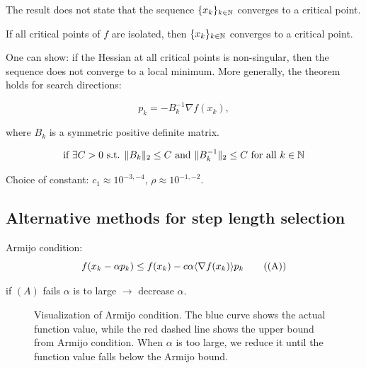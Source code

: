 \begin{remark}{}{}

    The result does not state that the sequence  \(\{x_k\}_{k \in \mathbb{N}}\) converges to a critical point.

    If all critical points of  \(f\) are isolated, then  \(\{x_k\}_{k \in \mathbb{N}}\) converges to a critical point.
\end{remark}

One can show: if the Hessian at all critical points is non-singular, then the sequence does not converge to a local minimum.
More generally, the theorem holds for search directions:

\[
    p_k = - B_k^{-1} \nabla f(x_k),
\]

where  \(B_k\) is a symmetric positive definite matrix.

\[
    \text{if } \exists C > 0 \text{ s.t. } \lVert B_k\rVert_2 \leq C \text{ and } \lVert B_k^{-1}\rVert_2 \leq C \text{ for all } k \in \mathbb{N}
\]

Choice of constant:  \(c_1 \approx 10^{-3,-4}\),  \(\rho \approx 10^{-1,-2}\).

\subsection*{Alternative methods for step length selection}

Armijo condition:
\[
    f(x_k - \alpha p_k) \leq f(x_k) - c \alpha \langle\nabla f(x_k)\rangle{p_k} \tag{(A)}
\]

if  \((A)\) fails  \(\alpha\) is to large  \(\to\) decrease  \(\alpha\).

\begin{figure}[H]
    \centering
    \caption{Visualization of Armijo condition. The blue curve shows the actual function value, while the red dashed line shows the upper bound from Armijo condition. When  \(\alpha\) is too large, we reduce it until the function value falls below the Armijo bound.}
\end{figure}


